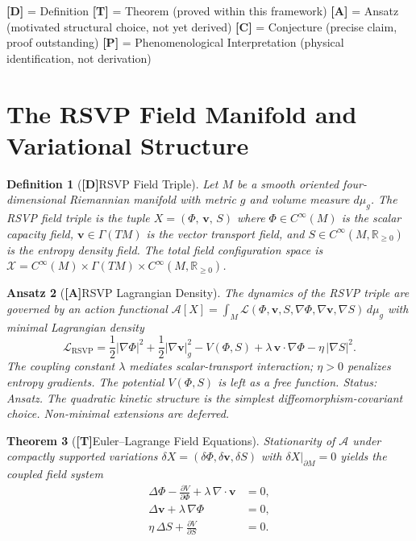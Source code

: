 \documentclass[12pt,a4paper]{article}
\newcommand{\claimD}{\textbf{[D]}\;}
\newcommand{\claimT}{\textbf{[T]}\;}
\newcommand{\claimA}{\textbf{[A]}\;}
\newtheorem{defn}{Definition}[section]
\newtheorem{appansatz}[defn]{Ansatz}
\newtheorem{appthm}[defn]{Theorem}
\begin{document}
\begin{claimlegend}
\small
\textbf{[D]} = Definition \quad
\textbf{[T]} = Theorem (proved within this framework) \quad
\textbf{[A]} = Ansatz (motivated structural choice, not yet derived) \quad
\textbf{[C]} = Conjecture (precise claim, proof outstanding) \quad
\textbf{[P]} = Phenomenological Interpretation (physical identification, not derivation)
\end{claimlegend}

\section{The RSVP Field Manifold and Variational Structure}

\begin{defn}[\claimD RSVP Field Triple]
Let $M$ be a smooth oriented four-dimensional Riemannian manifold with metric
$g$ and volume measure $d\mu_g$. The \emph{RSVP field triple} is the tuple
$X = (\Phi,\,\mathbf{v},\,S)$
where $\Phi \in C^\infty(M)$ is the scalar capacity field,
$\mathbf{v} \in \Gamma(TM)$ is the vector transport field, and
$S \in C^\infty(M,\mathbb{R}_{\geq 0})$ is the entropy density field.
The total field configuration space is
$\mathcal{X} = C^\infty(M)\times\Gamma(TM)\times C^\infty(M,\mathbb{R}_{\geq 0})$.
\end{defn}

\begin{appansatz}[\claimA RSVP Lagrangian Density]
The dynamics of the RSVP triple are governed by an action functional
$\mathcal{A}[X] = \int_M \mathcal{L}(\Phi,\mathbf{v},S,\nabla\Phi,\nabla\mathbf{v},\nabla S)\,d\mu_g$
with minimal Lagrangian density
\[
  \mathcal{L}_{\mathrm{RSVP}}
  = \frac{1}{2}|\nabla\Phi|^2
  + \frac{1}{2}|\nabla\mathbf{v}|_g^2
  - V(\Phi,S)
  + \lambda\,\mathbf{v}\cdot\nabla\Phi
  - \eta\,|\nabla S|^2.
\]
The coupling constant $\lambda$ mediates scalar-transport interaction; $\eta > 0$
penalizes entropy gradients. The potential $V(\Phi,S)$ is left as a free function.
\emph{Status: Ansatz.} The quadratic kinetic structure is the simplest
diffeomorphism-covariant choice. Non-minimal extensions are deferred.
\end{appansatz}

\begin{appthm}[\claimT Euler--Lagrange Field Equations]
Stationarity of $\mathcal{A}$ under compactly supported variations
$\delta X = (\delta\Phi, \delta\mathbf{v}, \delta S)$ with $\delta X|_{\partial M}=0$
yields the coupled field system
\begin{align}
  \Delta\Phi - \frac{\partial V}{\partial\Phi} + \lambda\,\nabla\cdot\mathbf{v}
  &= 0, \label{app:EL-phi}\\
  \Delta\mathbf{v} + \lambda\,\nabla\Phi
  &= 0, \label{app:EL-v}\\
  \eta\,\Delta S + \frac{\partial V}{\partial S}
  &= 0. \label{app:EL-S}
\end{align}
\end{appthm}
\end{document}
